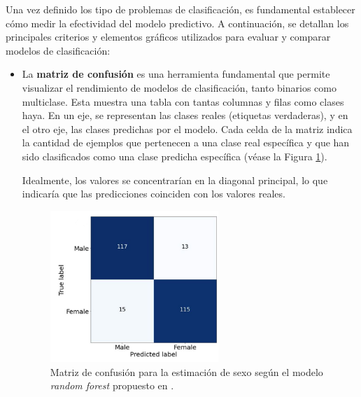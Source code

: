 


Una vez definido los tipo de problemas de clasificación, es fundamental establecer cómo medir la efectividad del 
modelo predictivo. A continuación, se detallan los principales criterios y elementos gráficos utilizados para 
evaluar y comparar modelos de clasificación:

\begin{itemize}
    
    \item La \textbf{matriz de confusión} es una herramienta fundamental que permite visualizar el rendimiento de 
    modelos de clasificación, tanto binarios como multiclase.
    Esta muestra una tabla con tantas columnas y filas como clases haya. En un eje, se representan las 
    clases reales (etiquetas verdaderas), y en el otro eje, las clases predichas por el modelo.
    Cada celda de la matriz indica la cantidad de ejemplos que pertenecen a una clase real específica y que han 
    sido clasificados como una clase predicha específica (véase la Figura \ref{fig:conf_matrix_binary}).

    Idealmente, los valores se concentrarían en la diagonal principal, lo que indicaría que las predicciones 
    coinciden con los valores reales.

    \begin{figure}[h]
        \centering
        \includegraphics[width=0.6\textwidth]{capitulos/cap_02/imagenes/confusion_matrix_binary.png}
        \caption{Matriz de confusión para la estimación de sexo según el modelo \textit{random forest} propuesto 
                 en \cite{bidmos2023}.} 
        \label{fig:conf_matrix_binary}
    \end{figure}


\end{itemize}
